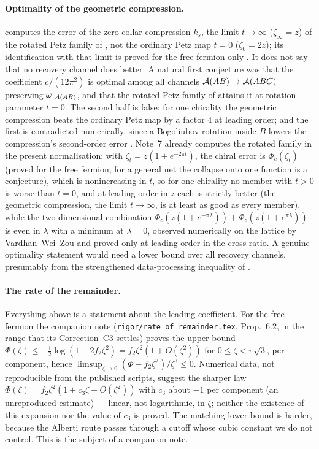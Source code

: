 \paragraph{Optimality of the geometric compression.}   computes the error of the zero-collar
compression $k_{s}$, the limit $t\to\infty$ ($\zeta_{\infty}=z$) of the rotated Petz family of , not the ordinary Petz map $t=0$ ($\zeta_{0}=2z$); its identification with that limit is proved for the free fermion only \cite{Paper1}.  It does not say that no recovery channel does better.  A natural first conjecture was that the
coefficient $c/(12\pi^{2})$ is optimal among all channels $\mathcal A(AB)\to\mathcal A(ABC)$ preserving $\omega|_{\mathcal A(AB)}$,
and that the rotated Petz family of \cite{FHSW} attains it at rotation parameter $t=0$.  The second half is false: for one chirality the geometric compression beats the ordinary Petz map by a factor $4$ at leading order; and the first is contradicted numerically, since a Bogoliubov rotation inside $B$ lowers the compression's second-order error \cite{Paper1}.  Note~7 already
computes the rotated family in the present normalisation: with $\zeta_{t}=z(1+e^{-2\pi t})$, the chiral
error is $\Phi_{c}(\zeta_{t})$ (proved for the free fermion; for a general net the collapse onto one function is a conjecture), which is nonincreasing in $t$, so for one chirality no member with $t>0$ is worse than $t=0$, and at leading order in $z$ each is strictly better (the geometric compression, the limit $t\to\infty$, is at least as good as every member), while the two-dimensional
combination $\Phi_{c}(z(1+e^{-\pi\lambda}))+\Phi_{\bar c}(z(1+e^{\pi\lambda}))$ is even in $\lambda$ with a
minimum at $\lambda=0$, observed numerically on the lattice by Vardhan--Wei--Zou \cite{VWZ} and proved only at leading order in the cross ratio.  A genuine
optimality statement would need a lower bound over all recovery channels, presumably from the strengthened
data-processing inequality of \cite{FHSW}.

\paragraph{The rate of the remainder.}  Everything above is a statement about the leading coefficient.  For the
free fermion the companion note (\texttt{rigor/rate\_of\_remainder.tex}, Prop.~6.2, in the range that its Correction~C3 settles) proves the upper bound $\Phi(\zeta)\le-\tfrac12\log(1-2f_{2}\zeta^{2})=f_{2}\zeta^{2}(1+O(\zeta^{2}))$ for $0\le\zeta<\pi\sqrt3$, per component, hence $\limsup_{\zeta\to0}(\Phi-f_{2}\zeta^{2})/\zeta^{3}\le0$.  Numerical data, not reproducible from the published scripts, suggest the sharper law $\Phi(\zeta)=f_{2}\zeta^{2}(1+c_{3}\zeta+O(\zeta^{2}))$ with
$c_{3}$ about $-1$ per component (an unreproduced estimate) --- linear, not logarithmic, in $\zeta$; neither the existence of this expansion nor the value of $c_{3}$ is proved.  The matching lower bound is harder,
because the Alberti route passes through a cutoff whose cubic constant we do not control.  This is the
subject of a companion note.

